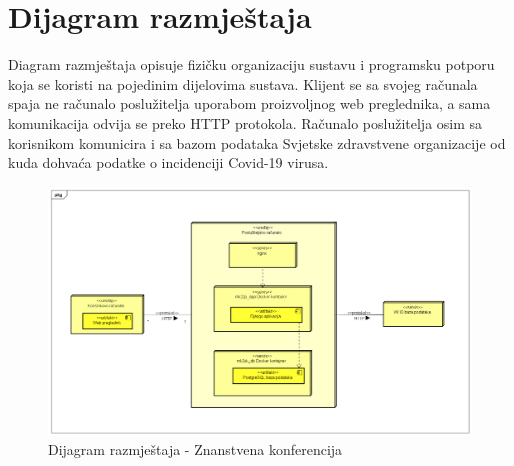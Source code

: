 			\eject 
		
		
		\section{Dijagram razmještaja}
		
		Diagram razmještaja opisuje fizičku organizaciju sustavu i programsku potporu koja se koristi na pojedinim dijelovima sustava. Klijent se sa svojeg računala spaja ne računalo poslužitelja uporabom proizvoljnog web preglednika, a sama komunikacija odvija se preko HTTP protokola. Računalo poslužitelja osim sa korisnikom komunicira i sa bazom podataka Svjetske zdravstvene organizacije od kuda dohvaća podatke o incidenciji Covid-19 virusa.
			 
			 
			\begin{figure}[H]
			 	\includegraphics[width= 15 cm, height= 25 cm, keepaspectratio]{dijagrami/Diagram razmjestaja.png} 
			 	\centering
			 	\caption{Dijagram razmještaja - Znanstvena konferencija}
			 	\label{fig:act5}
			 \end{figure}
			
